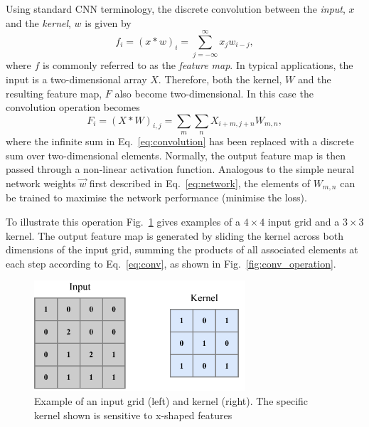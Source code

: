 Using standard CNN terminology, the discrete convolution between the \emph{input}, $x$ and the
\emph{kernel}, $w$ is given by
\begin{equation}
    f_{i}=(x*w)_{i}=\sum^{\infty}_{j=-\infty}x_{j}w_{i-j},
    \label{eq:convolution}
\end{equation}
where $f$ is commonly referred to as the \emph{feature map}. In typical applications, the input is
a two-dimensional array $X$. Therefore, both the kernel, $W$ and the resulting feature map, $F$
also become two-dimensional. In this case the convolution operation becomes
\begin{equation}
    F_{i}=(X*W)_{i,j}=\sum_{m}\sum_{n}X_{i+m,j+n}W_{m,n},
    \label{eq:conv}
\end{equation}
where the infinite sum in Eq.~\ref{eq:convolution} has been replaced with a discrete sum over
two-dimensional elements. Normally, the output feature map is then passed through a non-linear
activation function. Analogous to the simple neural network weights $\vec{w}$ first described in
Eq.~\ref{eq:network}, the elements of $W_{m,n}$ can be trained to maximise the network performance
(minimise the loss).

To illustrate this operation Fig.~\ref{fig:conv_input} gives examples of a $4 \times 4$ input grid
and a $3 \times 3$ kernel. The output feature map is generated by sliding the kernel across both
dimensions of the input grid, summing the products of all associated elements at each step
according to Eq.~\ref{eq:conv}, as shown in Fig.~\ref{fig:conv_operation}.

\begin{figure} %
    \includegraphics[width=0.7\textwidth]{diagrams/6-cvn/conv_input.pdf}
    \caption[Example of an input grid and kernel.]
    {Example of an input grid (left) and kernel (right). The specific kernel shown is sensitive to
        x-shaped features}
    \label{fig:conv_input}
\end{figure}


